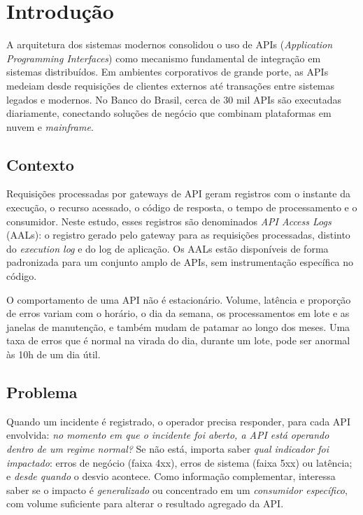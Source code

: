\documentclass[sigconf,nonacm]{acmart}
\begin{document}
\section{Introdução}

A arquitetura dos sistemas modernos consolidou o uso de APIs (\emph{Application Programming Interfaces}) como mecanismo fundamental de integração em sistemas distribuídos. Em ambientes corporativos de grande porte, as APIs medeiam desde requisições de clientes externos até transações entre sistemas legados e modernos. No Banco do Brasil, cerca de 30 mil APIs são executadas diariamente, conectando soluções de negócio que combinam plataformas em nuvem e \emph{mainframe}.

\subsection{Contexto}
Requisições processadas por gateways de API geram registros com o instante da execução, o recurso acessado, o código de resposta, o tempo de processamento e o consumidor. Neste estudo, esses registros são denominados \emph{API Access Logs} (AALs): o registro gerado pelo gateway para as requisições processadas, distinto do \emph{execution log} e do log de aplicação. Os AALs estão disponíveis de forma padronizada para um conjunto amplo de APIs, sem instrumentação específica no código.

O comportamento de uma API não é estacionário. Volume, latência e proporção de erros variam com o horário, o dia da semana, os processamentos em lote e as janelas de manutenção, e também mudam de patamar ao longo dos meses. Uma taxa de erros que é normal na virada do dia, durante um lote, pode ser anormal às 10h de um dia útil.

\subsection{Problema}
Quando um incidente é registrado, o operador precisa responder, para cada API envolvida: \emph{no momento em que o incidente foi aberto, a API está operando dentro de um regime normal?} Se não está, importa saber \emph{qual indicador foi impactado}: erros de negócio (faixa 4xx), erros de sistema (faixa 5xx) ou latência; e \emph{desde quando} o desvio acontece. Como informação complementar, interessa saber se o impacto é \emph{generalizado} ou concentrado em um \emph{consumidor específico}, com volume suficiente para alterar o resultado agregado da API.
\end{document}
